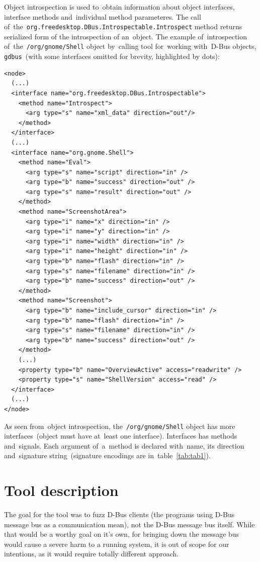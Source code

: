 \documentclass[conference]{IEEEtran}
\begin{document}
Object introspection is used to~obtain information about object interfaces,
interface methods and~individual method parameteres. The call
of~the~\texttt{org.freedesktop.DBus.Introspectable.Introspect} method returns
serialized form of the introspection of an~object. The example of~introspection
of~the~\texttt{/org/gnome/Shell} object by~calling tool for~working with~D-Bus
objects, \texttt{gdbus}~(with some interfaces omitted for brevity, highlighted
by dots):
\begin{verbatim}
<node>
  (...)
  <interface name="org.freedesktop.DBus.Introspectable">
    <method name="Introspect">
      <arg type="s" name="xml_data" direction="out"/>
    </method>
  </interface>
  (...)
  <interface name="org.gnome.Shell">
    <method name="Eval">
      <arg type="s" name="script" direction="in" />
      <arg type="b" name="success" direction="out" />
      <arg type="s" name="result" direction="out" />
    </method>
    <method name="ScreenshotArea">
      <arg type="i" name="x" direction="in" />
      <arg type="i" name="y" direction="in" />
      <arg type="i" name="width" direction="in" />
      <arg type="i" name="height" direction="in" />
      <arg type="b" name="flash" direction="in" />
      <arg type="s" name="filename" direction="in" />
      <arg type="b" name="success" direction="out" />
    </method>
    <method name="Screenshot">
      <arg type="b" name="include_cursor" direction="in" />
      <arg type="b" name="flash" direction="in" />
      <arg type="s" name="filename" direction="in" />
      <arg type="b" name="success" direction="out" />
    </method>
    (...)
    <property type="b" name="OverviewActive" access="readwrite" />
    <property type="s" name="ShellVersion" access="read" />
  </interface>
  (...)
</node>
\end{verbatim}

As seen from~object introspection, the~\texttt{/org/gnome/Shell} object has more
interfaces~(object must have at~least one interface). Interfaces has methods
and~signals. Each argument of~a~method is declared with~name, its direction
and~signature string~(signature encodings are in~table~\ref{tab:tab1}).


\section{Tool description}
The goal for the tool was to fuzz D-Bus clients (the programs using D-Bus
message bus as a communication mean), not the D-Bus message bus itself. While
that would be a worthy goal on it's own, for bringing down the message bus
would cause a severe harm to a running system, it is out of scope for our
intentions, as it would require totally different approach.
\end{document}
